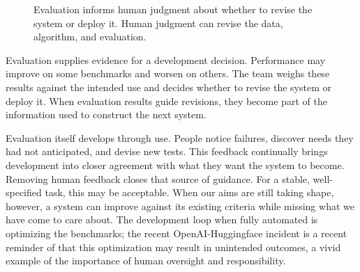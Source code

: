 \documentclass[11pt,twoside]{article}
\theoremstyle{definition}
\theoremstyle{remark}
\begin{document}
\begin{figure}[ht]
\centering
{}
\caption{Evaluation informs human judgment about whether to revise the system
or deploy it. Human judgment can revise the data, algorithm, and evaluation.}
\label{fig:development-loop}
\end{figure}

Evaluation supplies evidence for a development decision. Performance may
improve on some benchmarks and worsen on others. The team weighs these results
against the intended use and decides whether to revise the system or deploy
it. When evaluation results guide revisions, they become part of the
information used to construct the next system.

Evaluation itself develops through use. People notice failures, discover needs
they had not anticipated, and devise new tests. This feedback continually
brings development into closer agreement with what they want the system to
become. Removing human feedback closes that source of guidance. For a stable,
well-specified task, this may be acceptable. When our aims are still taking
shape, however, a system can improve against its existing criteria while
missing what we have come to care about. The development loop when fully automated
is optimizing the benchmarks; the recent OpenAI-Huggingface incident is a
recent reminder of that this optimization may result in unintended outcomes,
a vivid example of the importance of human oversight and responsibility.
\end{document}
